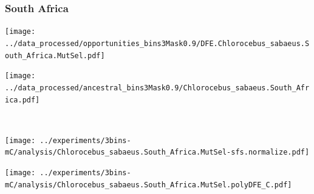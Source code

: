 \subsubsection{South Africa}

\begin{minipage}{0.49\linewidth}
    \texttt{[image: ../data\_processed/opportunities\_bins3Mask0.9/DFE.Chlorocebus\_sabaeus.South\_Africa.MutSel.pdf]}
\end{minipage}
\begin{minipage}{0.49\linewidth}
    \texttt{[image: ../data\_processed/ancestral\_bins3Mask0.9/Chlorocebus\_sabaeus.South\_Africa.pdf]}
\end{minipage}
\\
\begin{minipage}{0.49\linewidth}
    \texttt{[image: ../experiments/3bins-mC/analysis/Chlorocebus\_sabaeus.South\_Africa.MutSel-sfs.normalize.pdf]}
\end{minipage}
\begin{minipage}{0.4\linewidth}
    \texttt{[image: ../experiments/3bins-mC/analysis/Chlorocebus\_sabaeus.South\_Africa.MutSel.polyDFE\_C.pdf]}
\end{minipage}
